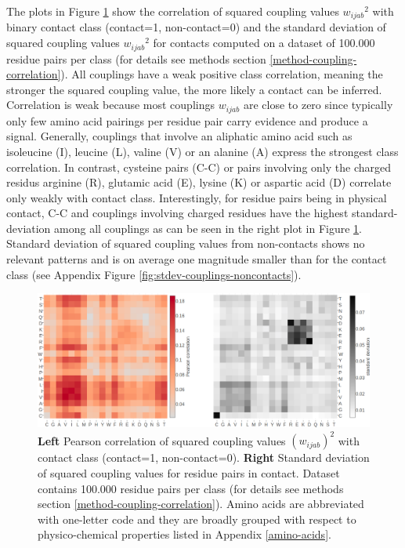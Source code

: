 \documentclass[11pt,a4paper,twoside]{book}
\newcommand{\wijab}{w_{ijab}}
\theoremstyle{definition}
\theoremstyle{definition}
\theoremstyle{remark}
\begin{document}
The plots in Figure \ref{fig:sq-coupling-correlation} show the
correlation of squared coupling values \({\wijab}^2\) with binary
contact class (contact=1, non-contact=0) and the standard deviation of
squared coupling values \({\wijab}^2\) for contacts computed on a
dataset of 100.000 residue pairs per class (for details see methods
section \ref{method-coupling-correlation}). All couplings have a weak
positive class correlation, meaning the stronger the squared coupling
value, the more likely a contact can be inferred. Correlation is weak
because most couplings \(\wijab\) are close to zero since typically only
few amino acid pairings per residue pair carry evidence and produce a
signal. Generally, couplings that involve an aliphatic amino acid such
as isoleucine (I), leucine (L), valine (V) or an alanine (A) express the
strongest class correlation. In contrast, cysteine pairs (C-C) or pairs
involving only the charged residus arginine (R), glutamic acid (E),
lysine (K) or aspartic acid (D) correlate only weakly with contact
class. Interestingly, for residue pairs being in physical contact, C-C
and couplings involving charged residues have the highest
standard-deviation among all couplings as can be seen in the right plot
in Figure \ref{fig:sq-coupling-correlation}. Standard deviation of
squared coupling values from non-contacts shows no relevant patterns and
is on average one magnitude smaller than for the contact class (see
Appendix Figure \ref{fig:stdev-couplings-noncontacts}).










\begin{figure}

{\centering \includegraphics[width=1\linewidth]{img/coupling_matrix_analysis/combi_squared_couplings_correlation_and_stddev_heatmap_notitle} 

}

\caption{\textbf{Left} Pearson correlation of squared
coupling values \((\wijab)^2\) with contact class (contact=1,
non-contact=0). \textbf{Right} Standard deviation of squared coupling
values for residue pairs in contact. Dataset contains 100.000 residue
pairs per class (for details see methods section
\ref{method-coupling-correlation}). Amino acids are abbreviated with
one-letter code and they are broadly grouped with respect to
physico-chemical properties listed in Appendix \ref{amino-acids}.}\label{fig:sq-coupling-correlation}
\end{figure}
\end{document}
